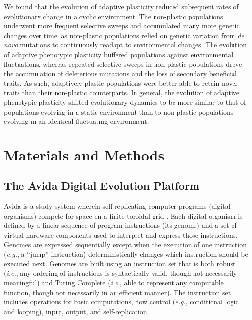 \begin{raggedbottom}
We found that the evolution of adaptive plasticity reduced subsequent rates of evolutionary change in a cyclic environment.
The non-plastic populations underwent more frequent selective sweeps and accumulated many more genetic changes over time, as non-plastic populations relied on genetic variation from \textit{de novo} mutations to continuously readapt to environmental changes.
The evolution of adaptive phenotypic plasticity buffered populations against environmental fluctuations, whereas repeated selective sweeps in non-plastic populations drove the accumulation of deleterious mutations and the loss of secondary beneficial traits. %
As such, adaptively plastic populations were better able to retain novel traits than their non-plastic counterparts.
In general, the evolution of adaptive phenotypic plasticity shifted evolutionary dynamics to be more similar to that of populations evolving in a static environment than to non-plastic populations evolving in an identical fluctuating environment.

\section{Materials and Methods}
\label{sec:methods}

\subsection{The Avida Digital Evolution Platform}
\label{sec:methods:avida}

Avida is a study system wherein self-replicating computer programs (digital organisms) compete for space on a finite toroidal grid \citep{ofria_avida:_2009}.
Each digital organism is defined by a linear sequence of program instructions (its genome) and a set of virtual hardware components used to interpret and express those instructions.
Genomes are expressed sequentially except when the execution of one instruction (\textit{e.g.}, a ``jump'' instruction) deterministically changes which instruction should be executed next.
Genomes are built using an instruction set that is both robust (\textit{i.e.}, any ordering of instructions is syntactically valid, though not necessarily meaningful) and Turing Complete (\textit{i.e.}, able to represent any computable function, though not necessarily in an efficient manner).
The instruction set includes operations for basic computations, flow control (\textit{e.g.}, conditional logic and looping), input, output, and self-replication.


\end{raggedbottom}
